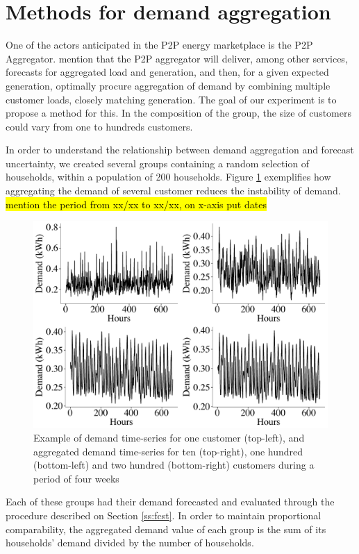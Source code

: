 \documentclass[preprint,3p,12pt,authoryear]{elsarticle}
\begin{document}
\section{Methods for demand aggregation}
\label{sec:load_aggr}
One of the  actors anticipated in the P2P energy marketplace is the P2P Aggregator. \citet{pouttu2017p2p} mention that the P2P aggregator will deliver, among other services, forecasts for aggregated load and generation, and then, for a given expected generation, optimally procure aggregation of demand by combining multiple customer loads, closely matching generation. The goal of our experiment is to propose a method for this. In the composition of the group, the size of customers could vary from one to hundreds customers.

In order to understand the relationship between demand aggregation and forecast uncertainty, we created several groups containing a random selection of households, within a population of 200 households.
Figure \ref{fig:4weeksaggr} exemplifies how aggregating the demand of several customer reduces the instability of demand.
\hl{mention the period from xx/xx to xx/xx, on x-axis put dates}

\begin{figure}
  \centering
  \includegraphics[width=0.8\columnwidth]{2017-10-13_compare_aggrdemands}
  \caption{Example of demand time-series for one customer (top-left), and aggregated demand time-series for ten (top-right), one hundred (bottom-left) and two hundred (bottom-right) customers during a period of four weeks}
  \label{fig:4weeksaggr}
\end{figure}

Each of these groups had their demand forecasted and evaluated through the procedure described on Section \ref{ss:fcst}.
In order to maintain proportional comparability, the aggregated demand value of each group is the sum of its households' demand divided by the number of households.
\end{document}
